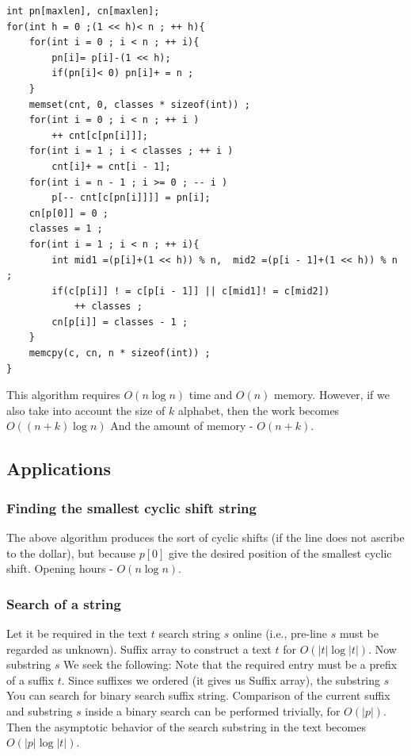 \begin{verbatim}
int pn[maxlen], cn[maxlen];
for(int h = 0 ;(1 << h)< n ; ++ h){
    for(int i = 0 ; i < n ; ++ i){
        pn[i]= p[i]-(1 << h);
        if(pn[i]< 0) pn[i]+ = n ;
    }
    memset(cnt, 0, classes * sizeof(int)) ;
    for(int i = 0 ; i < n ; ++ i )
        ++ cnt[c[pn[i]]];
    for(int i = 1 ; i < classes ; ++ i )
        cnt[i]+ = cnt[i - 1];
    for(int i = n - 1 ; i >= 0 ; -- i )
        p[-- cnt[c[pn[i]]]] = pn[i];
    cn[p[0]] = 0 ;
    classes = 1 ;
    for(int i = 1 ; i < n ; ++ i){
        int mid1 =(p[i]+(1 << h)) % n,  mid2 =(p[i - 1]+(1 << h)) % n ;
        if(c[p[i]] ! = c[p[i - 1]] || c[mid1]! = c[mid2])
            ++ classes ;
        cn[p[i]] = classes - 1 ;
    }
    memcpy(c, cn, n * sizeof(int)) ;
} 
\end{verbatim}
This algorithm requires $O (n \log n)$ time and $O (n)$ memory. However, if we also take into account the size of $k$ alphabet, then the work becomes $O ((n + k) \log n)$ And the amount of memory - $O (n + k)$.

\subsection{ Applications }

\subsubsection{ Finding the smallest cyclic shift string }

The above algorithm produces the sort of cyclic shifts (if the line does not ascribe to the dollar), but because $p [0]$ give the desired position of the smallest cyclic shift. Opening hours - $O (n \log n)$.

\subsubsection{ Search of a string }

Let it be required in the text $t$ search string $s$ online (i.e., pre-line $s$ must be regarded as unknown). Suffix array to construct a text $t$ for $O (| t | \log | t |)$. Now substring $s$ We seek the following: Note that the required entry must be a prefix of a suffix $t$. Since suffixes we ordered (it gives us Suffix array), the substring $s$ You can search for binary search suffix string. Comparison of the current suffix and substring $s$ inside a binary search can be performed trivially, for $O (| p |)$. Then the asymptotic behavior of the search substring in the text becomes $O (| p | \log | t |)$.

